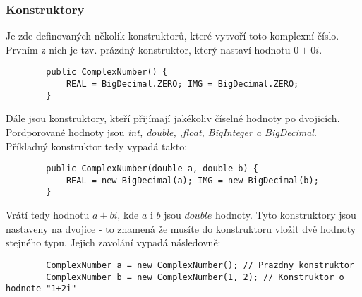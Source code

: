 \documentclass{article}
\begin{document}
    \subsubsection{Konstruktory}
    Je zde definovaných několik konstruktorů, které vytvoří toto komplexní číslo. Prvním z nich je tzv.
    prázdný konstruktor, který nastaví hodnotu $0+0i$.
    \begin{lstlisting}
        public ComplexNumber() {
            REAL = BigDecimal.ZERO; IMG = BigDecimal.ZERO;
        }
    \end{lstlisting}
    Dále jsou konstruktory, kteří přijímají jakékoliv číselné hodnoty po dvojicích. Pordporované hodnoty jsou
    \textit{int, double, ,float, BigInteger a BigDecimal}. Příkladný konstruktor tedy vypadá takto:
    \begin{lstlisting}
        public ComplexNumber(double a, double b) {
            REAL = new BigDecimal(a); IMG = new BigDecimal(b);
        }
    \end{lstlisting}
    Vrátí tedy hodnotu $a+bi$, kde $a$ i $b$ jsou $double$ hodnoty. Tyto konstruktory jsou nastaveny na dvojice -
    to znamená že musíte do konstruktoru vložit dvě hodnoty stejného typu. \newline
    Jejich zavolání vypadá následovně:
    \begin{lstlisting}
        ComplexNumber a = new ComplexNumber(); // Prazdny konstruktor
        ComplexNumber b = new ComplexNumber(1, 2); // Konstruktor o hodnote "1+2i"
    \end{lstlisting}
\end{document}

